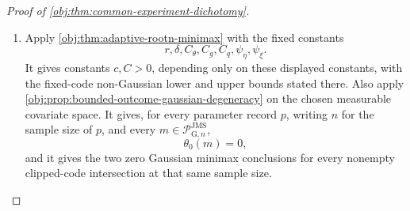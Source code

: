 \documentclass[11pt]{article}
\begin{document}
\begin{proof}[Proof of \cref{obj:thm:common-experiment-dichotomy}]
\begin{enumerate}
\item
Apply \cref{obj:thm:adaptive-rootn-minimax} with the fixed constants
\[
r,\delta,C_{\theta},C_g,C_q,\psi_{\eta},\psi_{\xi}.
\]
It gives constants \(c,C>0\), depending only on these displayed constants, with the fixed-code non-Gaussian lower and upper bounds stated there. Also apply \cref{obj:prop:bounded-outcome-gaussian-degeneracy} on the chosen measurable covariate space. It gives, for every parameter record \(p\), writing \(n\) for the sample size of \(p\), and every \(m\in\mathcal P_{\mathrm G,n}^{\mathrm{JMS}}\),
\[
\theta_0(m)=0,
\]
and it gives the two zero Gaussian minimax conclusions for every nonempty clipped-code intersection at that same sample size.


\end{enumerate}
\end{proof}
\end{document}
